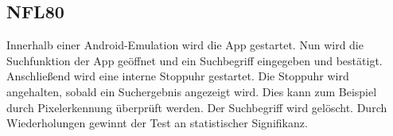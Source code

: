\subsection*{NFL80}

Innerhalb einer Android-Emulation wird die App gestartet.
Nun wird die Suchfunktion der App geöffnet und ein Suchbegriff eingegeben und bestätigt.
Anschließend wird eine interne Stoppuhr gestartet.
Die Stoppuhr wird angehalten, sobald ein Suchergebnis angezeigt wird.
Dies kann zum Beispiel durch Pixelerkennung überprüft werden.
Der Suchbegriff wird gelöscht.
Durch Wiederholungen gewinnt der Test an statistischer Signifikanz.